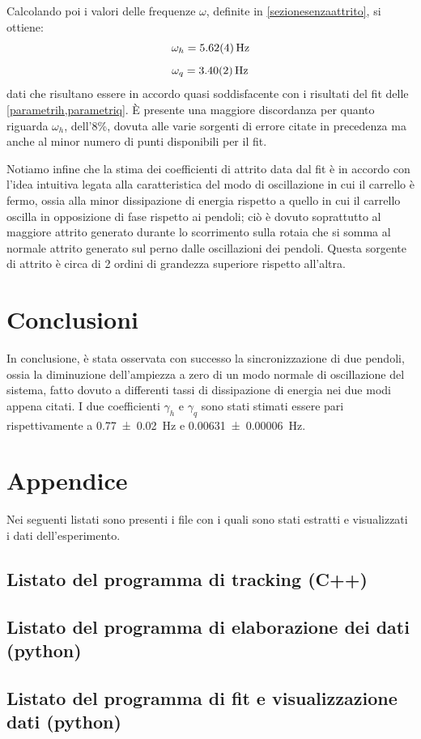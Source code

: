 \documentclass[11pt, a4paper, twoside, italian]{article}
\begin{document}
Calcolando poi i valori delle frequenze $\omega$, definite in \cref{sezionesenzaattrito},
si ottiene:
$$
\omega_h = \SI{5.62 \pm 0.04}{\hertz}
$$
$$
\omega_q = \SI{3.40 \pm 0.02}{\hertz}
$$
dati che risultano essere in accordo quasi soddisfacente con i risultati del fit delle \cref{parametrih,parametriq}.
È presente una maggiore discordanza per quanto riguarda $\omega_h$, dell'8\%, dovuta 
alle varie sorgenti di errore citate in precedenza ma anche al minor numero di punti disponibili
per il fit.

Notiamo infine che la stima dei coefficienti di attrito data dal fit è in accordo 
con l'idea intuitiva legata alla caratteristica del modo di oscillazione in cui il carrello 
è fermo, ossia alla minor dissipazione di energia rispetto a quello in cui il carrello oscilla in opposizione di 
fase rispetto ai pendoli; ciò è dovuto soprattutto al maggiore attrito generato
durante lo scorrimento sulla rotaia che si somma al normale attrito generato sul perno 
dalle oscillazioni dei pendoli. Questa sorgente di attrito è circa di 2 ordini di grandezza superiore 
rispetto all'altra.
\section{Conclusioni}
In conclusione, è stata osservata con successo la sincronizzazione di due pendoli, ossia la 
 diminuzione dell'ampiezza a zero di un modo normale di oscillazione del sistema, fatto dovuto a differenti
tassi di dissipazione di energia nei due modi appena citati. I due coefficienti $\gamma_h$ 
e $\gamma_q$ sono stati stimati essere pari rispettivamente a \SI{0.77 \pm 0.02}{\hertz} e 
\SI{0.00631 \pm 0.00006}{\hertz}.

\section{Appendice}
Nei seguenti listati sono presenti i file con i quali sono stati estratti 
e visualizzati i dati dell'esperimento.
\subsection{Listato del programma di tracking (C++)}

\label{listatocpp}
\subsection{Listato del programma di elaborazione dei dati (python)}

\label{listatoavg}
\subsection{Listato del programma di fit e visualizzazione dati (python)}

\label{listatoplotter}
\end{document}
